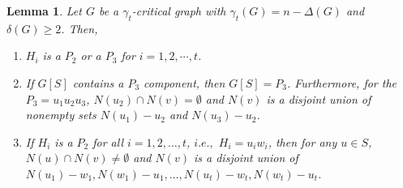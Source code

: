 \documentclass[12pt]{amsart}
\newtheorem{lem}[thm]{Lemma}
\begin{document}
\begin{lem} \label{properties} Let $G$ be a $\gamma_{t}$-critical graph with
$\gamma_{t}(G)=n-\Delta(G)$ and $\delta(G) \ge 2$. Then,
\begin{enumerate}
 \item[$(1)$] $H_i$ is a $P_{2}$ or a $P_{3}$ for $i=1,2, \cdots,t$.
 \item[$(2)$] If $G[S]$ contains a $P_{3}$ component, then
 $G[S]=P_{3}$. Furthermore, for the $P_3 = u_1 u_2 u_3$, $N(u_2) \cap N(v) = \emptyset$ and $N(v)$ is a disjoint union of nonempty sets $N(u_1)-u_2$ and
 $N(u_3)-u_2$.
 \item[$(3)$] If $H_i$ is a $P_2$ for all $i=1,2, \ldots,t$, $i.e.,$ $H_i = u_iw_i$, then for any $u \in S$, $N(u) \cap N(v) \neq \emptyset$ and
 $N(v)$ is a disjoint union of $N(u_1)-w_1,N(w_1)-u_1, \ldots ,N(u_t)-w_t,N(w_t)-u_t $.  \\
 \end{enumerate}
\end{lem}
\end{document}
